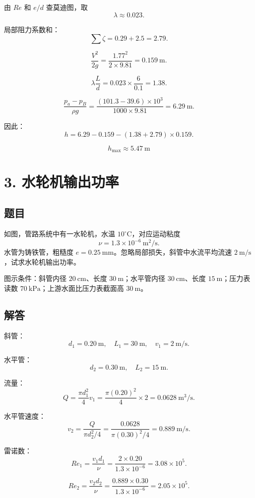 \documentclass[11pt,a4paper]{ctexart}
\begin{document}
由 \(Re\) 和 \(e/d\) 查莫迪图，取
\[
\lambda\approx0.023.
\]

局部阻力系数和：
\[
\sum\zeta=0.29+2.5=2.79.
\]

\[
\frac{V^2}{2g}=\frac{1.77^2}{2\times9.81}=0.159\ \mathrm{m}.
\]

\[
\lambda\frac{L}{d}=0.023\times\frac{6}{0.1}=1.38.
\]

\[
\frac{p_a-p_B}{\rho g}
=\frac{(101.3-39.6)\times10^3}{1000\times9.81}
=6.29\ \mathrm{m}.
\]

因此：
\[
h=6.29-0.159-(1.38+2.79)\times0.159.
\]

\[
\boxed{h_{\max}\approx5.47\ \mathrm{m}}
\]

\section*{3. 水轮机输出功率}

\subsection*{题目}

如图，管路系统中有一水轮机，水温 \(10^\circ\mathrm{C}\)，对应运动粘度
\[
\nu=1.3\times10^{-6}\ \mathrm{m^2/s}.
\]
水管为铸铁管，粗糙度 \(e=0.25\ \mathrm{mm}\)。忽略局部损失，斜管中水流平均流速 \(2\ \mathrm{m/s}\)，试求水轮机输出功率。

图示条件：斜管内径 \(20\ \mathrm{cm}\)、长度 \(30\ \mathrm{m}\)；水平管内径 \(30\ \mathrm{cm}\)、长度 \(15\ \mathrm{m}\)；压力表读数 \(70\ \mathrm{kPa}\)；上游水面比压力表截面高 \(30\ \mathrm{m}\)。

\subsection*{解答}

斜管：
\[
d_1=0.20\ \mathrm{m},\quad L_1=30\ \mathrm{m},\quad v_1=2\ \mathrm{m/s}.
\]

水平管：
\[
d_2=0.30\ \mathrm{m},\quad L_2=15\ \mathrm{m}.
\]

流量：
\[
Q=\frac{\pi d_1^2}{4}v_1
=\frac{\pi(0.20)^2}{4}\times2
=0.0628\ \mathrm{m^3/s}.
\]

水平管速度：
\[
v_2=\frac{Q}{\pi d_2^2/4}
=\frac{0.0628}{\pi(0.30)^2/4}
=0.889\ \mathrm{m/s}.
\]

雷诺数：
\[
Re_1=\frac{v_1d_1}{\nu}
=\frac{2\times0.20}{1.3\times10^{-6}}
=3.08\times10^5.
\]

\[
Re_2=\frac{v_2d_2}{\nu}
=\frac{0.889\times0.30}{1.3\times10^{-6}}
=2.05\times10^5.
\]
\end{document}

